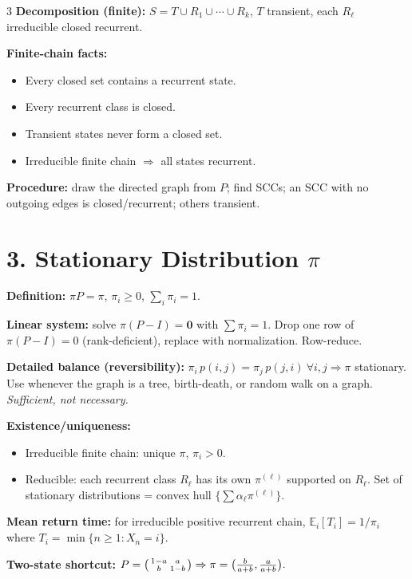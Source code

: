 \documentclass[8pt]{extarticle}
\newcommand{\E}{\mathbb{E}}
\renewcommand{\b}[1]{\mathbf{#1}}
\begin{document}
\begin{multicols*}{3}
		\textbf{Decomposition (finite):} $S=T\cup R_1\cup\cdots\cup R_k$, $T$ transient, each $R_\ell$ irreducible closed recurrent.
		
		\textbf{Finite-chain facts:}
		\begin{itemize}
			\item Every closed set contains a recurrent state.
			\item Every recurrent class is closed.
			\item Transient states never form a closed set.
			\item Irreducible finite chain $\Rightarrow$ all states recurrent.
		\end{itemize}
		
		\textbf{Procedure:} draw the directed graph from $P$; find SCCs; an SCC with no outgoing edges is closed/recurrent; others transient.
		
		\section*{3. Stationary Distribution $\pi$}
		
		\textbf{Definition:} $\pi P=\pi$, $\pi_i\ge 0$, $\sum_i\pi_i=1$.
		
		\textbf{Linear system:} solve $\pi(P-I)=\b 0$ with $\sum\pi_i=1$. Drop one row of $\pi(P-I)=0$ (rank-deficient), replace with normalization. Row-reduce.
		
		\textbf{Detailed balance (reversibility):} $\pi_i\,p(i,j)=\pi_j\,p(j,i)\ \forall i,j\Rightarrow\pi$ stationary. Use whenever the graph is a tree, birth-death, or random walk on a graph. \emph{Sufficient, not necessary.}
		
		\textbf{Existence/uniqueness:}
		\begin{itemize}
			\item Irreducible finite chain: unique $\pi$, $\pi_i>0$.
			\item Reducible: each recurrent class $R_\ell$ has its own $\pi^{(\ell)}$ supported on $R_\ell$. Set of stationary distributions = convex hull $\{\sum\alpha_\ell\pi^{(\ell)}\}$.
		\end{itemize}
		
		\textbf{Mean return time:} for irreducible positive recurrent chain, $\E_i[T_i]=1/\pi_i$ where $T_i=\min\{n\ge 1:X_n=i\}$. 
		
		\textbf{Two-state shortcut:} $P=\begin{psmallmatrix}1-a & a\\ b & 1-b\end{psmallmatrix}\Rightarrow\pi=\bigl(\tfrac{b}{a+b},\tfrac{a}{a+b}\bigr).$
		

\end{multicols*}
\end{document}
